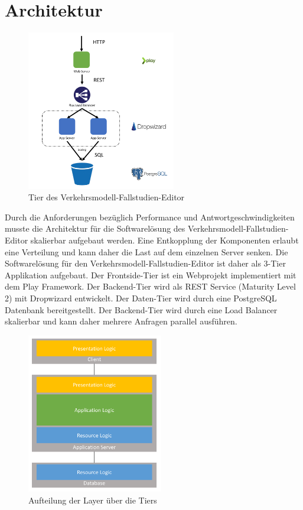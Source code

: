 \section{Architektur}
\begin{figure}[H]
\centering
\includegraphics[height=7cm]{images/Architektur.png}
\caption{Tier des Verkehrsmodell-Fallstudien-Editor}
\label{tier_architecture}
\end{figure}
Durch die Anforderungen bezüglich Performance und Antwortgeschwindigkeiten musste die Architektur für die Softwarelösung des Verkehrsmodell-Fallstudien-Editor skalierbar aufgebaut werden. Eine Entkopplung der Komponenten erlaubt eine Verteilung und kann daher die Last auf dem einzelnen Server senken. Die Softwarelösung für den Verkehrsmodell-Fallstudien-Editor ist daher als 3-Tier Applikation aufgebaut. Der Frontside-Tier ist ein Webprojekt implementiert mit dem Play Framework. Der Backend-Tier wird als REST Service (Maturity Level 2) mit Dropwizard entwickelt. Der Daten-Tier wird durch eine PostgreSQL Datenbank bereitgestellt. Der Backend-Tier wird durch eine Load Balancer skalierbar und kann daher mehrere Anfragen parallel ausführen.
\begin{figure}[H]
\centering
\includegraphics[height=7cm]{images/layers.png}
\caption{Aufteilung der Layer über die Tiers}
\label{tier_architecture}
\end{figure}
